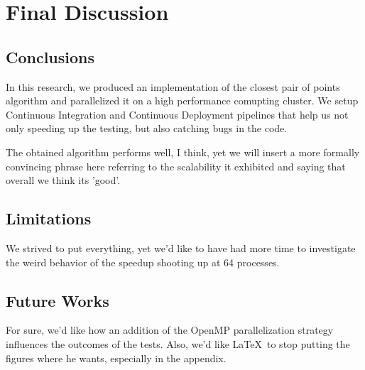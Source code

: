 \section{Final Discussion}
\label{sec:final_discussion}

\subsection{Conclusions}
In this research, we produced an implementation of the closest pair of points algorithm and parallelized it on a high performance comupting cluster.
We setup Continuous Integration and Continuous Deployment pipelines that help us not only speeding up the testing, but also catching bugs in the code.

The obtained algorithm performs well, I think, yet we will insert a more formally convincing phrase here referring to the scalability it exhibited and saying that overall we think its 'good'.

\subsection{Limitations}
We strived to put everything, yet we'd like to have had more time to investigate the weird behavior of the speedup shooting up at 64 processes.

\subsection{Future Works}
For sure, we'd like how an addition of the OpenMP parallelization strategy influences the outcomes of the tests.
Also, we'd like \LaTeX~to stop putting the figures where he wants, especially in the appendix.

